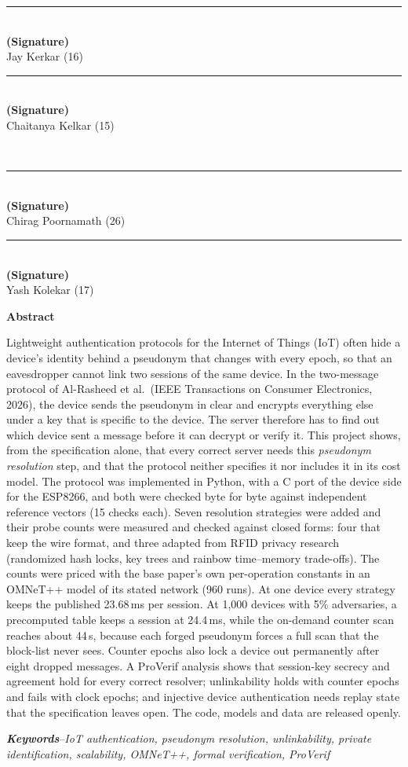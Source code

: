 \documentclass[12pt,a4paper,oneside]{report}
\numberwithin{equation}{chapter}
\newcommand{\prelimtitle}[2][\itshape]{%
  \begin{center}{\georgia\bfseries#1\fontsize{16}{20}\selectfont #2\par}\end{center}\vspace{18pt}}
\newcommand{\sigblock}[1]{%
  \begin{minipage}[t]{0.46\textwidth}\centering
  \rule{1.4in}{0.4pt}\\[-2pt]{\bfseries (Signature)}\\#1\end{minipage}}
\newcommand{\StudentA}{Jay Kerkar}
\newcommand{\StudentB}{Chaitanya Kelkar}
\newcommand{\StudentC}{Chirag Poornamath}
\newcommand{\StudentD}{Yash Kolekar}
\newcommand{\RollA}{16}
\newcommand{\RollB}{15}
\newcommand{\RollC}{26}
\newcommand{\RollD}{17}
\begin{document}
\vspace{0.8in}
\noindent\sigblock{\StudentA{} (\RollA)}\hfill\sigblock{\StudentB{} (\RollB)}\\[0.7in]
\noindent\sigblock{\StudentC{} (\RollC)}\hfill\sigblock{\StudentD{} (\RollD)}
\clearpage

\prelimtitle[\upshape]{Abstract}
Lightweight authentication protocols for the Internet of Things (IoT) often hide a device's identity behind a pseudonym that changes with every epoch, so that an eavesdropper cannot link two sessions of the same device. In the two-message protocol of Al-Rasheed et al.\ (IEEE Transactions on Consumer Electronics, 2026), the device sends the pseudonym in clear and encrypts everything else under a key that is specific to the device. The server therefore has to find out which device sent a message before it can decrypt or verify it. This project shows, from the specification alone, that every correct server needs this \emph{pseudonym resolution} step, and that the protocol neither specifies it nor includes it in its cost model. The protocol was implemented in Python, with a C port of the device side for the ESP8266, and both were checked byte for byte against independent reference vectors (15 checks each). Seven resolution strategies were added and their probe counts were measured and checked against closed forms: four that keep the wire format, and three adapted from RFID privacy research (randomized hash locks, key trees and rainbow time--memory trade-offs). The counts were priced with the base paper's own per-operation constants in an OMNeT++ model of its stated network (960 runs). At one device every strategy keeps the published 23.68\,ms per session. At 1,000 devices with 5\% adversaries, a precomputed table keeps a session at 24.4\,ms, while the on-demand counter scan reaches about 44\,s, because each forged pseudonym forces a full scan that the block-list never sees. Counter epochs also lock a device out permanently after eight dropped messages. A ProVerif analysis shows that session-key secrecy and agreement hold for every correct resolver; unlinkability holds with counter epochs and fails with clock epochs; and injective device authentication needs replay state that the specification leaves open. The code, models and data are released openly.

\vspace{12pt}
\noindent\textbf{\textit{Keywords}}--\textit{IoT authentication, pseudonym resolution, unlinkability, private identification, scalability, OMNeT++, formal verification, ProVerif}
\clearpage
\end{document}
